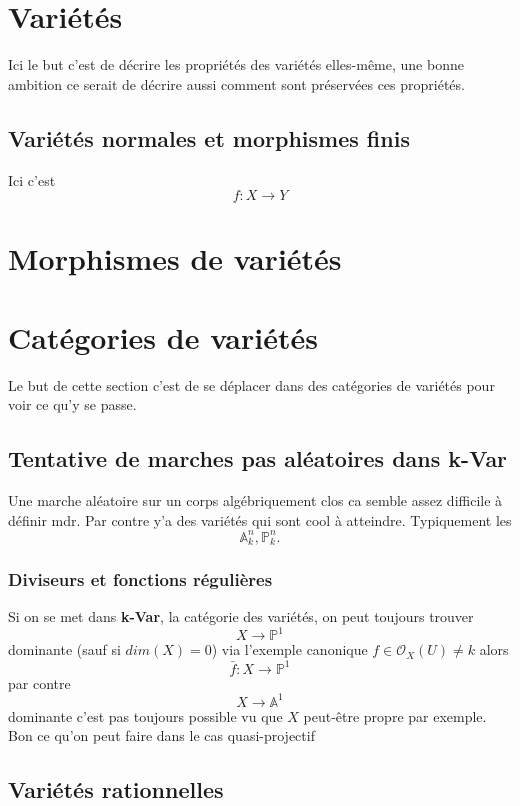\documentclass[a4paper,12pt]{book}
\newcommand{\A}{\mathbb{A}}
\newcommand{\Or}{\mathcal{O}}
\renewcommand{\P}{\mathbb{P}}
\theoremstyle{plain}
\theoremstyle{definition}
\theoremstyle{remark}
\begin{document}
\chapter{Variétés}
Ici le but c'est de décrire les propriétés des variétés elles-même,
une bonne ambition ce serait de décrire aussi comment sont préservées
ces propriétés.
\section{Variétés normales et morphismes finis}
Ici c'est 
\[f\colon X\to Y\]
\chapter{Morphismes de variétés}


\chapter{Catégories de variétés}
Le but de cette section c'est de se déplacer dans des catégories 
de variétés pour voir ce qu'y se passe. 

\section{Tentative de marches pas aléatoires dans \textbf{k-Var}}
Une marche aléatoire sur un corps algébriquement clos ca semble assez
difficile à définir mdr. Par contre y'a des variétés qui sont cool
à atteindre. Typiquement les
\[\A^n_k,\P^n_k.\]
\subsection*{Diviseurs et fonctions régulières}
Si on se met dans \textbf{k-Var}, la catégorie des variétés,
on peut toujours trouver 
\[X\to \P^1\]
dominante (sauf si $dim(X)=0$) via l'exemple canonique 
$f\in \Or_X(U)\ne k$ alors 
\[\bar f\colon X\to \P^1\]
par contre 
\[X\to \A^1\]
dominante c'est pas toujours possible vu que $X$ peut-être propre par
exemple. 
Bon ce qu'on peut faire dans le cas quasi-projectif


\section{Variétés rationnelles}







\printbibliography
\end{document}
